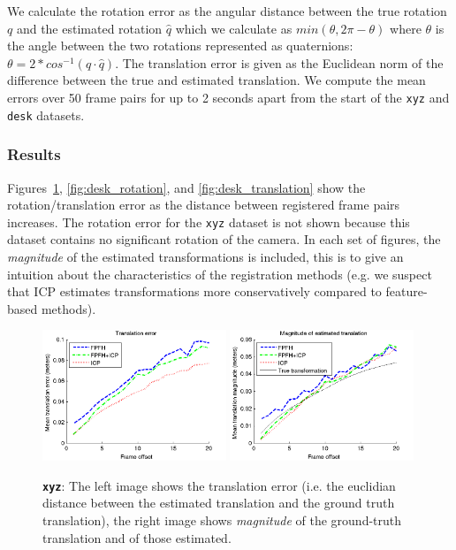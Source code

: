\documentclass[a4paper]{article}
\begin{document}
We calculate the rotation error as the angular distance between the true rotation $q$ and the estimated rotation $\hat q$ which we calculate as $min(\theta, 2\pi - \theta)$ where $\theta$ is the angle between the two rotations represented as quaternions: $\theta = 2 * cos^{-1}(q \cdot \hat q)$. %
The translation error is given as the Euclidean norm of the difference between the true and estimated translation. We compute the mean errors over 50 frame pairs for up to 2 seconds apart from the start of the \texttt{xyz} and \texttt{desk} datasets.

\subsubsection{Results}

Figures~\ref{fig:xyz_translation}, \ref{fig:desk_rotation}, and \ref{fig:desk_translation} show the rotation/translation error as the distance between registered frame pairs increases. The rotation error for the \texttt{xyz} dataset is not shown because this dataset contains no significant rotation of the camera. In each set of figures, the \emph{magnitude} of the estimated transformations is included, this is to give an intuition about the characteristics of the registration methods (e.g. we suspect that \ac{ICP} estimates transformations more conservatively compared to feature-based methods). 

\begin{figure}[H]
    \centering
        \includegraphics[width=0.49\textwidth]{ims/xyzTranslationerror.png}
        \includegraphics[width=0.49\textwidth]{ims/xyzMagnitudeofestimatedtranslation.png}
    \caption{\textbf{\texttt{xyz}}: The left image shows the translation error (i.e. the euclidian distance between the estimated translation and the ground truth translation), the right image shows \emph{magnitude} of the ground-truth translation and of those estimated.}
    \label{fig:xyz_translation}
\end{figure}
\end{document}
